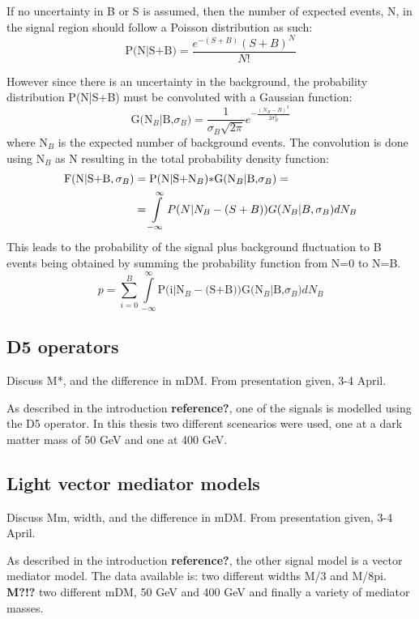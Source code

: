 If no uncertainty in B or S is assumed, then the number of expected events, N, in the signal region should follow a Poisson distribution as such:
\begin{equation}
\text{P(N|S+B)}=\frac{e^{-(S+B)}(S+B)^N}{N!}
\end{equation} 

However since there is an uncertainty in the background, the probability distribution P(N|S+B) must be convoluted with a Gaussian function:
\begin{equation}
 \text{G(N$_B$|B,$\sigma_B$)}=\frac{1}{\sigma_B \sqrt{2 \pi}} e^{-\frac{(N_B-B)^2}{2\sigma_B^2}}
\end{equation}
where N$_B$ is the expected number of background events. The convolution is done using N$_B$ as N resulting in the total probability density function:
\begin{align}
\text{F(N|S+B},\sigma_B) &= \text{P(N|S+N$_B$)$\ast$G(N$_B$|B,$\sigma_B$)}= \notag \\
&=\int\limits_{-\infty}^{\infty}P(N|N_B - (S+B))G(N_B|B,\sigma_B) dN_B
\end{align}
This leads to the probability of the signal plus background fluctuation to B events being obtained by summing the probability function from N=0 to N=B.
\begin{equation}
p = \sum\limits_{i=0}^{B} \int\limits_{-\infty}^{\infty} \text{P(i|N$_B - $(S+B))G(N$_B$|B,$\sigma_B$)} dN_B
\end{equation}



\subsection{D5 operators}
Discuss M*, and the difference in mDM. From presentation given, 3-4 April. 

As described in the introduction \textbf{reference?}, one of the signals is modelled using the D5 operator. In this thesis two different scenearios were used, one at a dark matter mass of 50 GeV and one at 400 GeV.

\subsection{Light vector mediator models}
Discuss Mm, width, and the difference in mDM. From presentation given, 3-4 April.

As described in the introduction \textbf{reference?}, the other signal model is a vector mediator model. The data available is: two different widths M/3 and M/8pi. \textbf{M?!?}
two different mDM, 50 GeV and 400 GeV and finally a variety of mediator masses. 

